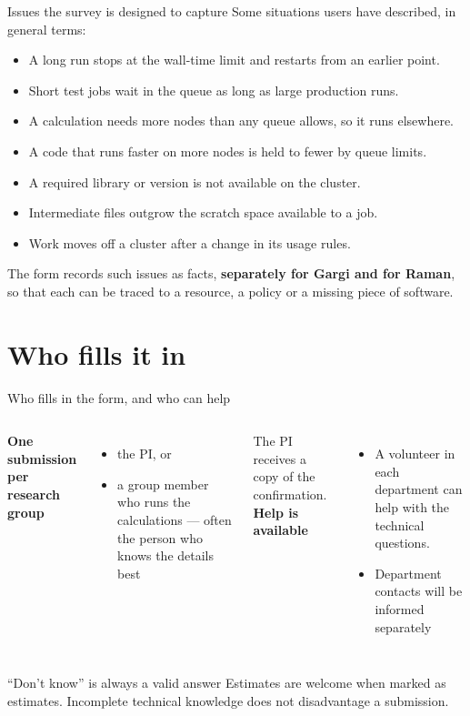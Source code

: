 \documentclass[aspectratio=169,11pt]{beamer}
\begin{document}
\begin{frame}{Issues the survey is designed to capture}
  Some situations users have described, in general terms:
  \medskip
  \begin{itemize}
    \item A long run stops at the wall-time limit and restarts from an earlier point.
    \item Short test jobs wait in the queue as long as large production runs.
    \item A calculation needs more nodes than any queue allows, so it runs elsewhere.
    \item A code that runs faster on more nodes is held to fewer by queue limits.
    \item A required library or version is not available on the cluster.
    \item Intermediate files outgrow the scratch space available to a job.
    \item Work moves off a cluster after a change in its usage rules.
  \end{itemize}
  \vfill
  \small The form records such issues as facts, \textbf{separately for Gargi and for Raman},
  so that each can be traced to a resource, a policy or a missing piece of software.
\end{frame}

\section{Who fills it in}

\begin{frame}{Who fills in the form, and who can help}
  \begin{columns}[T]
    \textbf{One submission per research group}
    \begin{itemize}
      \item the PI, or
      \item a group member who runs the calculations --- often the person who knows the details best
    \end{itemize}
    The PI receives a copy of the confirmation.
    \textbf{Help is available}
    \begin{itemize}
      \item A volunteer in each department can help with the technical questions.
      \item Department contacts will be informed separately
    \end{itemize}
  \end{columns}
  \vfill
  \begin{block}{``Don't know'' is always a valid answer}
    Estimates are welcome when marked as estimates. Incomplete technical knowledge does not disadvantage a submission.
  \end{block}
\end{frame}
\end{document}
